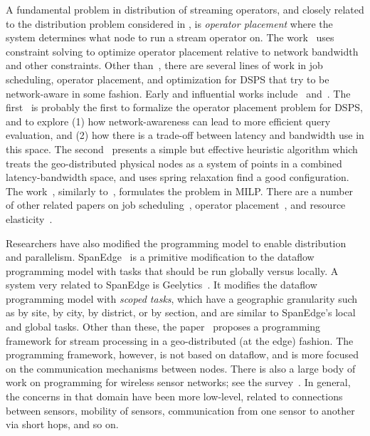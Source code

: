 A fundamental problem in distribution of streaming operators, and closely related to the distribution problem considered in ,
is \emph{operator placement} where the system determines what node to run a stream operator on.
The work~\cite{cardellini2016optimal} uses constraint solving to optimize operator placement relative to network bandwidth and other constraints.
Other than~\cite{cardellini2016optimal}, there are several lines of work in job scheduling, operator placement, and optimization for DSPS that try to be network-aware in some fashion. Early and influential works include~\cite{ahmad2004network} and~\cite{pietzuch2006network}.
The first~\cite{ahmad2004network} is probably the first to formalize the operator placement problem for DSPS, and to explore (1) how network-awareness can lead to more efficient query evaluation, and (2) how there is a trade-off between latency and bandwidth use in this space.
The second~\cite{pietzuch2006network} presents a simple but effective heuristic algorithm which treats the geo-distributed physical nodes as a system of points in a combined latency-bandwidth space, and uses spring relaxation find a good configuration.
The work~\cite{gu2015general}, similarly to~\cite{cardellini2016optimal}, formulates the problem in MILP.
There are a number of other related papers on job scheduling~\cite{aniello2013adaptive,xu2014tstorm,eidenbenz2016task,wolf2008soda,fu2019edgewise}, operator placement~\cite{bonfils2004adaptive,tziritas2016improving,rizou2010solving,lakshmanan2008placement},
and resource elasticity~\cite{cardellini2018decentralized,hochreiner2016elastic,cardellini2018optimal,dias2018dsp-survey}.

Researchers have also modified the programming model to enable distribution and parallelism.
SpanEdge~\cite{sajjad2016spanedge} is a primitive modification to the dataflow programming model with tasks that should be run globally versus locally.
A system very related to SpanEdge is Geelytics~\cite{cheng2015geelytics}.
It modifies the dataflow programming model with \emph{scoped tasks}, which have a geographic granularity such as by site, by city, by district, or by section, and are similar to SpanEdge's local and global tasks.
Other than these, the paper~\cite{renart2017datadrivenstreamedge} proposes a programming framework for stream processing in a geo-distributed (at the edge) fashion. The programming framework, however, is not based on dataflow, and is more focused on the communication mechanisms between nodes. There is also a large body of work on programming for wireless sensor networks; see the survey~\cite{mottola2011programming-wsn}. In general, the concerns in that domain have been more low-level, related to connections between sensors, mobility of sensors, communication from one sensor to another via short hops, and so on.

